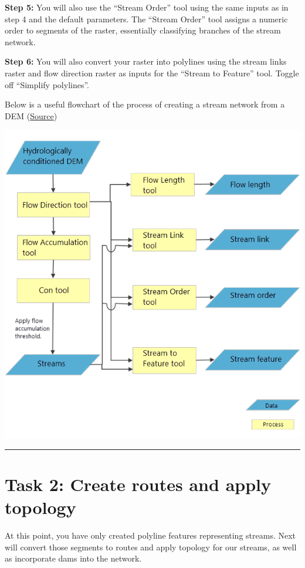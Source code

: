 \documentclass[
]{book}
\begin{document}
\textbf{Step 5:} You will also use the ``Stream Order'' tool using the same inputs as in step 4 and the default parameters. The ``Stream Order'' tool assigns a numeric order to segments of the raster, essentially classifying branches of the stream network.

\textbf{Step 6:} You will also convert your raster into polylines using the stream links raster and flow direction raster as inputs for the ``Stream to Feature'' tool. Toggle off ``Simplify polylines''.

Below is a useful flowchart of the process of creating a stream network from a DEM (\href{https://pro.arcgis.com/en/pro-app/tool-reference/spatial-analyst/deriving-runoff-characteristics.htm}{Source})

\includegraphics[width=0.75\linewidth]{images/02-flow-chart}

\begin{center}\rule{0.5\linewidth}{0.5pt}\end{center}

\hypertarget{task-2-create-routes-and-apply-topology}{%
\section*{Task 2: Create routes and apply topology}\label{task-2-create-routes-and-apply-topology}}

At this point, you have only created polyline features representing streams. Next will convert those segments to routes and apply topology for our streams, as well as incorporate dams into the network.
\end{document}
